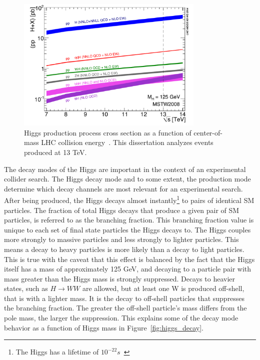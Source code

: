 \begin{figure}[hbtp]
 \begin{center}
   \includegraphics[width=0.8\textwidth]{ch2_figs/higgs_prod_xsec.pdf}
   \caption[Higgs production cross section vs LHC collision energy]{Higgs production process cross section as a function of center-of-mass LHC collision energy~\cite{lhchxswg}.
     This dissertation analyzes events produced at 13 TeV.}
   \label{fig:higgs_prod_plot}
 \end{center}
\end{figure}


The decay modes of the Higgs are important in the context of an experimental collider search. The Higgs decay mode and to some extent, the production mode
determine which decay channels are most relevant for an experimental search. After being produced, the Higgs decays almost instantly\footnote{
The Higgs has a lifetime of $10^{-22}s$~\cite{pdg}} to pairs of identical SM particles. 
The fraction of total Higgs decays that produce a given pair of SM particles, is referred to as the branching fraction. This branching fraction value is unique
to each set of final state particles the Higgs decays to.
The Higgs couples more strongly to massive particles and less strongly to lighter particles. This means a decay to heavy
particles is more likely than a decay to light particles. This is true with the caveat that this effect is balanced by the fact that the Higgs itself has a
mass of approximately 125 GeV, and decaying to a particle pair with mass greater than the Higgs mass is strongly suppressed. Decays to heavier
states, such as $H\rightarrow WW$ are allowed, but at least one W is produced off-shell, that is with a lighter mass. It is the decay to off-shell
particles that suppresses the branching fraction. The greater the off-shell particle's mass differs from the pole mass, the larger the suppression.
This explains some of the decay mode behavior as a function of Higgs mass in
Figure~\ref{fig:higgs_decay}.

